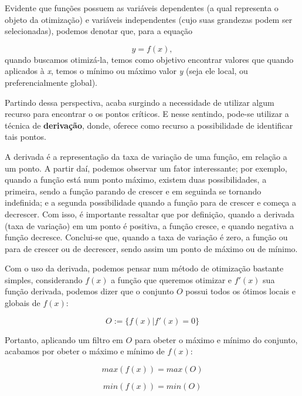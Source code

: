 Evidente que funções possuem as variáveis dependentes (a qual representa o
objeto da otimização) e variáveis independentes (cujo suas grandezas podem ser
selecionadas), podemos denotar que, para a equação

\begin{equation}
	y = f(x),
\end{equation}
quando buscamos otimizá-la, temos como objetivo encontrar valores que quando
aplicados à \textit{x}, temos o mínimo ou máximo valor \textit{y} (seja ele
local, ou preferencialmente global).

Partindo dessa perspectiva, acaba surgindo a necessidade de utilizar algum
recurso para encontrar o os pontos críticos. E nesse sentindo, pode-se utilizar
a técnica de \textbf{derivação}, donde, oferece como recurso a possibilidade de
identificar tais pontos.

A derivada é a representação da taxa de variação de uma função, em relação a
um ponto. A partir daí, podemos observar um fator interessante; por exemplo,
quando a função está num ponto máximo, existem duas possibilidades, a primeira,
sendo a função parando de crescer e em seguinda se tornando indefinida; e a
segunda possibilidade quando a função para de crescer e começa a decrescer.
Com isso, é importante ressaltar que por definição, quando a derivada (taxa de
variação) em um ponto é positiva, a função cresce, e quando negativa a função
decresce. Conclui-se que, quando a taxa de variação é zero, a função ou para de
crescer ou de decrescer, sendo assim um ponto de máximo ou de mínimo.

Com o uso da derivada, podemos pensar num método de otimização bastante simples,
considerando \(f(x)\) a função que queremos otimizar e \(f'(x)\) sua função
derivada, podemos dizer que o conjunto $O$ possui todos os ótimos locais e
globais de \(f(x)\):

\begin{equation}
    O := \{f(x) | f'(x) = 0\}
\end{equation}


Portanto, aplicando um filtro em $O$ para obeter o máximo e mínimo do conjunto,
acabamos por obeter o máximo e mínimo de \(f(x)\):


\begin{equation}
    max(f(x)) = max(O)
\end{equation}

\begin{equation}
    min(f(x)) = min(O)
\end{equation}


